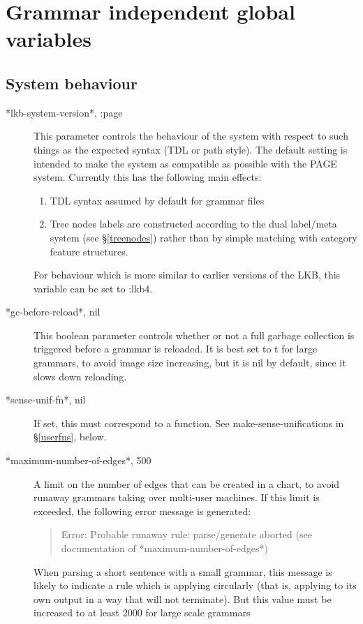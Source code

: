 \documentclass[12pt]{report}
\newenvironment{error}%
{\begin{quote}
\tt
}%
{\end{quote}
}
\begin{document}
\section{Grammar independent global variables}
\label{indglob}

\subsection{System behaviour}
\label{sysbeh}
\begin{description}
\item[*lkb-system-version*, :page]
This parameter controls the behaviour of the system with respect to
such things as the expected syntax (TDL or path style).  The default
setting is intended to make the system as compatible as possible with
the PAGE system.  Currently this has the following main effects:
\begin{enumerate}
\item TDL syntax assumed by default for grammar files
\item Tree nodes labels are constructed according to the dual
label/meta system (see \S\ref{treenodes}) rather than by simple
matching with category feature structures.
\end{enumerate}
For behaviour which is more similar to earlier versions of the LKB,
this variable can be set to :lkb4.
\item[*gc-before-reload*, nil] This boolean parameter controls
whether or not 
a full garbage collection is triggered before a grammar is reloaded.
It is best set to t for large grammars, to avoid image size increasing,
but it is nil by default, since it slows down reloading.
\item[*sense-unif-fn*, nil]  If set, this must correspond to
a function.
See make-sense-unifications in \S\ref{userfns},
below.
\item[*maximum-number-of-edges*, 500] A limit on the number of edges that can
be created in a chart, to avoid runaway grammars taking over multi-user
machines.  If this limit is exceeded, the following error
message is generated:
\begin{error}    
Error: Probable runaway rule: parse/generate aborted 
(see documentation of *maximum-number-of-edges*)
\end{error}
When parsing a short sentence with a small grammar, this message 
is likely to indicate a rule which is applying circularly
(that is, applying to its own output in a way that will not terminate).
But this value must be increased to at least 2000 for large scale grammars

\end{description}
\end{document}
